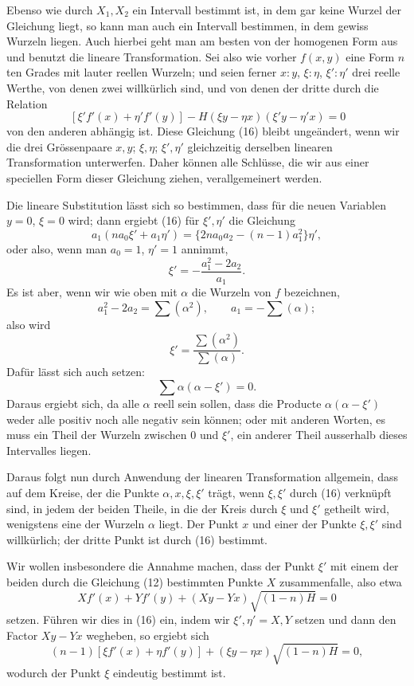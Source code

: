 \documentclass[11pt]{article}
\begin{document}
Ebenso wie durch $X_1,X_2$ ein Intervall bestimmt ist, in dem gar keine Wurzel der Gleichung liegt, so kann man auch ein Intervall bestimmen, in dem gewiss Wurzeln liegen. Auch hierbei geht man am besten von der homogenen Form aus und benutzt die lineare Transformation. Sei also wie vorher $f(x,y)$ eine Form $n$ten Grades mit lauter reellen Wurzeln; und seien ferner $x:y$, $\xi:\eta$, $\xi':\eta'$ drei reelle Werthe, von denen zwei willkürlich sind, und von denen der dritte durch die Relation
\begin{equation}
[\xi f'(x)+\eta f'(y)]\,[\xi' f'(x)+\eta'f'(y)]
-H(\xi y-\eta x)(\xi'y-\eta'x)=0
\tag{16}
\end{equation}
von den anderen abhängig ist. Diese Gleichung (16) bleibt ungeändert, wenn wir die drei Grössenpaare $x,y$; $\xi,\eta$; $\xi',\eta'$ gleichzeitig derselben linearen Transformation unterwerfen. Daher können alle Schlüsse, die wir aus einer speciellen Form dieser Gleichung ziehen, verallgemeinert werden.

Die lineare Substitution lässt sich so bestimmen, dass für die neuen Variablen $y=0$, $\xi=0$ wird; dann ergiebt (16) für $\xi',\eta'$ die Gleichung
\[
        a_1(na_0\xi'+a_1\eta')=\{2na_0a_2-(n-1)a_1^2\}\eta',
\]
oder also, wenn man $a_0=1$, $\eta'=1$ annimmt,
\[
        \xi'=-\frac{a_1^2-2a_2}{a_1}.
\]
Es ist aber, wenn wir wie oben mit $\alpha$ die Wurzeln von $f$ bezeichnen,
\[
        a_1^2-2a_2=\sum(\alpha^2),\qquad a_1=-\sum(\alpha);
\]
also wird
\[
        \xi'=\frac{\sum(\alpha^2)}{\sum(\alpha)}.
\]
Dafür lässt sich auch setzen:
\[
        \sum\alpha(\alpha-\xi')=0.
\]
Daraus ergiebt sich, da alle $\alpha$ reell sein sollen, dass die Producte $\alpha(\alpha-\xi')$ weder alle positiv noch alle negativ sein können; oder mit anderen Worten, es muss ein Theil der Wurzeln zwischen $0$ und $\xi'$, ein anderer Theil ausserhalb dieses Intervalles liegen.

Daraus folgt nun durch Anwendung der linearen Transformation allgemein, dass auf dem Kreise, der die Punkte $\alpha,x,\xi,\xi'$ trägt, wenn $\xi,\xi'$ durch (16) verknüpft sind, in jedem der beiden Theile, in die der Kreis durch $\xi$ und $\xi'$ getheilt wird, wenigstens eine der Wurzeln $\alpha$ liegt. Der Punkt $x$ und einer der Punkte $\xi,\xi'$ sind willkürlich; der dritte Punkt ist durch (16) bestimmt.

Wir wollen insbesondere die Annahme machen, dass der Punkt $\xi'$ mit einem der beiden durch die Gleichung (12) bestimmten Punkte $X$ zusammenfalle, also etwa
\begin{equation}
        Xf'(x)+Yf'(y)+(Xy-Yx)\sqrt{(1-n)H}=0
\tag{17}
\end{equation}
setzen. Führen wir dies in (16) ein, indem wir $\xi',\eta'=X,Y$ setzen und dann den Factor $Xy-Yx$ wegheben, so ergiebt sich
\begin{equation}
        (n-1)[\xi f'(x)+\eta f'(y)]+(\xi y-\eta x)\sqrt{(1-n)H}=0,
\tag{18}
\end{equation}
wodurch der Punkt $\xi$ eindeutig bestimmt ist.
\end{document}
